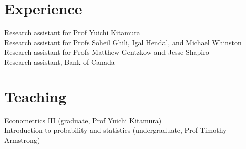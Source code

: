 \documentclass[11pt]{article} %
\begin{document}
\section*{Experience}

 Research assistant for Prof Yuichi Kitamura \\
 Research assistant for Profs Soheil Ghili, Igal Hendal, and Michael Whinston \\
  Research assistant for Profs Matthew Gentzkow and Jesse Shapiro \\
 Research assistant, Bank of Canada \\

\section*{Teaching}

 Econometrics III (graduate, Prof Yuichi Kitamura) \\
 Introduction to probability and statistics (undergraduate, Prof Timothy Armstrong)



\vfill %
\end{document}
